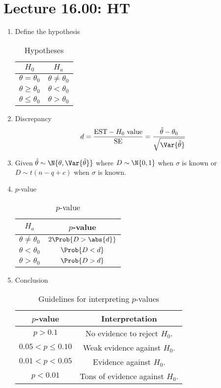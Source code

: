 \section{Lecture 16.00: HT}
\begin{enumerate}[(1)]
    \item Define the hypothesis
          \begin{table}[!htbp]
              \centering
              \caption{Hypotheses}
              \begin{NiceTabular}{cc}
                  $ H_0 $                & $ H_a $                \\
                  \midrule
                  $ \theta=\theta_0 $    & $ \theta\ne \theta_0 $ \\
                  $ \theta\ge \theta_0 $ & $ \theta<\theta_0 $    \\
                  $ \theta\le \theta_0 $ & $ \theta>\theta_0 $
              \end{NiceTabular}
          \end{table}
    \item Discrepancy
          \[ d=\frac{\text{EST}-\text{$H_0$ value}}{\text{SE}}=\frac{\hat{\theta}-\theta_0}{\sqrt{\Var{\tilde{\theta}}}}   \]
    \item Given $ \tilde{\theta} \sim \N{\theta,\Var{\tilde{\theta}}} $
          where $ D \sim \N{0,1} $ when $ \sigma $ is known or
          $ D \sim t(n-q+c) $ when $ \sigma $ is known.
    \item $ p $-value
          \begin{table}[!htbp]
              \centering
              \caption{$ p $-value}
              \begin{NiceTabular}{cc}
                  $ H_a $                & $ p $-value           \\
                  \midrule
                  $ \theta\ne \theta_0 $ & $ 2\Prob{D>\abs{d}} $ \\
                  $ \theta<\theta_0 $    & $ \Prob{D<d} $        \\
                  $ \theta>\theta_0 $    & $ \Prob{D>d} $
              \end{NiceTabular}
          \end{table}
    \item Conclusion
          \begin{table}[!htbp]
              \centering
              \caption{Guidelines for interpreting $ p $-values}
              \begin{NiceTabular}{cc}
                  $ p $-value        & Interpretation                    \\
                  \midrule
                  $ p>0.1 $          & No evidence to reject $ H_0 $.    \\
                  $ 0.05<p\le 0.10 $ & Weak evidence against $ H_0 $.    \\
                  $ 0.01<p<0.05 $    & Evidence against $ H_0 $.         \\
                  $ p<0.01 $         & Tons of evidence against $ H_0 $.
              \end{NiceTabular}
          \end{table}
\end{enumerate}
